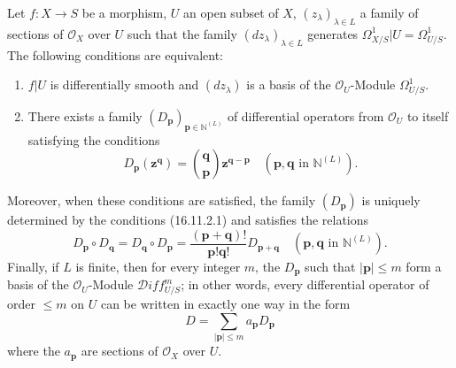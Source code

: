 \begin{theorem}[16.11.2]
\label{IV.16.11.2}
Let $f:X\to S$ be a morphism, $U$ an open subset of $X$,
$(z_\lambda)_{\lambda\in L}$ a family of sections of $\mathcal{O}_X$
over $U$ such that the family $(dz_\lambda)_{\lambda\in L}$ generates
$\varOmega_{X/S}^1|U=\varOmega_{U/S}^1$. The following conditions are
equivalent:
\begin{enumerate}
  \item[\textup{a)}] $f|U$ is differentially smooth and $(dz_\lambda)$ is a basis
  of the $\mathcal{O}_U$-Module $\varOmega_{U/S}^1$.
  \item[\textup{b)}] There exists a family
  $(D_{\mathbf{p}})_{\mathbf{p}\in\mathbb{N}^{(L)}}$ of differential
  operators from $\mathcal{O}_U$ to itself satisfying the conditions
  \[
    D_{\mathbf{p}}(\mathbf{z}^{\mathbf{q}})
    =\binom{\mathbf{q}}{\mathbf{p}}
      \mathbf{z}^{\mathbf{q}-\mathbf{p}}
    \quad(\mathbf{p},\mathbf{q}\text{ in }\mathbb{N}^{(L)}).
    \tag{16.11.2.1}
    \label{IV.16.11.2.1}
  \]
\end{enumerate}
Moreover, when these conditions are satisfied, the family
$(D_{\mathbf{p}})$ is uniquely determined by the conditions
\textup{(16.11.2.1)} and satisfies the relations
\[
  D_{\mathbf{p}}\circ D_{\mathbf{q}}
  =D_{\mathbf{q}}\circ D_{\mathbf{p}}
  =\frac{(\mathbf{p}+\mathbf{q})!}{\mathbf{p}!\mathbf{q}!}
    D_{\mathbf{p}+\mathbf{q}}
  \quad(\mathbf{p},\mathbf{q}\text{ in }\mathbb{N}^{(L)}).
  \tag{16.11.2.2}
  \label{IV.16.11.2.2}
\]
Finally, if $L$ is finite, then for every integer $m$, the $D_{\mathbf{p}}$
such that $|\mathbf{p}|\leq m$ form a basis of the $\mathcal{O}_U$-Module
$\mathscr{D}\!iff_{U/S}^m$; in other words, every differential operator
of order $\leq m$ on $U$ can be written in exactly one way in the form
\[
  D=\sum_{|\mathbf{p}|\leq m}a_{\mathbf{p}}D_{\mathbf{p}}
\]
where the $a_{\mathbf{p}}$ are sections of $\mathcal{O}_X$ over
$U$.
\end{theorem}


